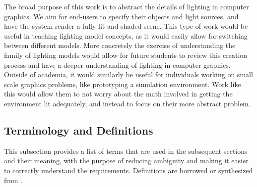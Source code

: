 \documentclass[12pt]{article}
\begin{document}
The broad purpose of this work is to abstract the details of lighting in 
computer graphics. We aim for end-users to specify their objects and light 
sources, and have the system render a fully lit and shaded scene. This type of 
work would be useful in teaching lighting model concepts, as it would easily 
allow for switching between different models. More concretely the exercise of 
understanding the family of lighting models would allow for future students to 
review this creation process and have a deeper understanding of lighting in 
computer graphics. Outside of academia, it would similarly be useful for 
individuals working on small scale graphics problems, like prototyping a 
simulation environment. Work like this would allow them to not worry about the 
math involved in getting the environment lit adequately, and instead to focus 
on their more abstract problem.

\subsection{Terminology and  Definitions}
This subsection provides a list of terms that are used in the subsequent
sections and their meaning, with the purpose of reducing ambiguity and making it
easier to correctly understand the requirements. Definitions are borrowed or 
synthesized from \cite{Lengyel2003,Comninos2005,shreiner2012}.
\end{document}
